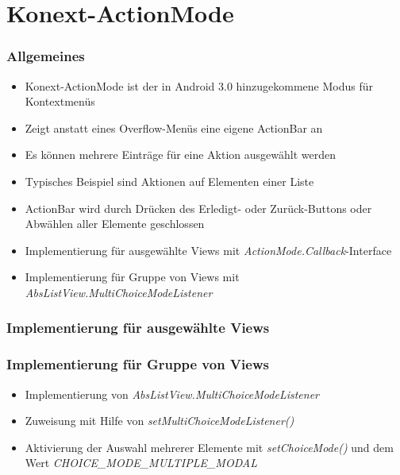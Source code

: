\section{Konext-ActionMode}
\begin{frame}
   \frametitle{Allgemeines}
   \begin{itemize}
      \item Konext-ActionMode ist der in Android 3.0 hinzugekommene Modus für Kontextmenüs
      \item Zeigt anstatt eines Overflow-Menüs eine eigene ActionBar an
      \item Es können mehrere Einträge für eine Aktion ausgewählt werden
      \item Typisches Beispiel sind Aktionen auf Elementen einer Liste
      \item ActionBar wird durch Drücken des Erledigt- oder 
         Zurück-Buttons oder Abwählen aller Elemente geschlossen
      \item Implementierung für ausgewählte Views mit \emph{ActionMode.Callback}-Interface
      \item Implementierung für Gruppe von Views mit \emph{AbsListView.MultiChoiceModeListener}
   \end{itemize}
\end{frame}

\begin{frame}
   \frametitle{Implementierung für ausgewählte Views}
   

   
\end{frame}

\begin{frame}
   \frametitle{Implementierung für Gruppe von Views}
   \begin{itemize}
      \item Implementierung von \emph{AbsListView.MultiChoiceModeListener}
      \item Zuweisung mit Hilfe von \emph{setMultiChoiceModeListener()}
      \item Aktivierung der Auswahl mehrerer Elemente mit \emph{setChoiceMode()} 
         und dem Wert \emph{CHOICE\_MODE\_MULTIPLE\_MODAL}
   \end{itemize}
\end{frame}


